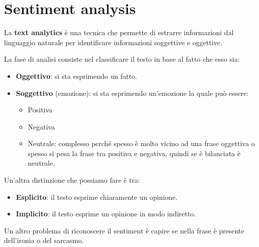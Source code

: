 \section{Sentiment analysis}
\begin{definizione}
      La \textbf{text analytics} è una tecnica che permette di estrarre informazioni
      dal linguaggio naturale per identificare informazioni soggettive e oggettive.
\end{definizione}
La fase di analisi consiste nel classificare il testo in base al fatto che esso
sia:
\begin{itemize}
      \item \textbf{Oggettivo}: si sta esprimendo un fatto.
      \item \textbf{Soggettivo} (emozione): si sta esprimendo un'emozione la quale
            può essere:
            \begin{itemize}
                  \item Positiva
                  \item Negativa
                  \item Neutrale: complesso perché spesso è molto vicino ad una
                        frase oggettiva o spesso si pesa la frase tra positiva e
                        negativa, quindi se è bilanciata è neutrale.
            \end{itemize}
\end{itemize}
Un'altra distinzione che possiamo fare è tra:
\begin{itemize}
      \item \textbf{Esplicito}: il testo esprime chiaramente un opinione.
      \item \textbf{Implicito}: il testo esprime un opinione in modo indiretto.
\end{itemize}
Un altro problema di riconoscere il sentiment è capire se nella frase è
presente dell'ironia o del sarcasmo.
